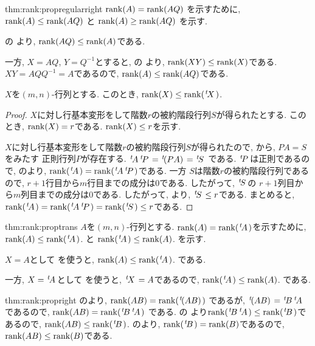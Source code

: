 \begin{proofof*}{thm:rank:prop}{regularright}
   $\operatorname{rank}(A)=\operatorname{rank}(AQ)$
  を示すために,
   $\operatorname{rank}(A)\leq\operatorname{rank}(AQ)$
  と
   $\operatorname{rank}(A)\geq\operatorname{rank}(AQ)$
  を示す.
  
  の
  より, $\operatorname{rank}(AQ)\leq \operatorname{rank}(A)$である.
  
  一方, 
  $X=AQ$, $Y=Q^{-1}$とすると,
  の
  より, $\operatorname{rank}(XY)\leq \operatorname{rank}(X)$である.
  $XY=AQQ^{-1}=A$であるので,
  $\operatorname{rank}(A)\leq\operatorname{rank}(AQ)$である.
\end{proofof*}

\begin{lemma}
  \label{lem:ineq:transrank}
  $X$を$(m,n)$-行列とする.
  このとき, $\operatorname{rank}(X)\leq \operatorname{rank}({\left.^{t}\!X\right.})$.
\end{lemma}
\begin{proof}
  $X$に対し行基本変形をして階数$r$の被約階段行列$S$が得られたとする.
  このとき, $\operatorname{rank}(X)=r$である.
  $\operatorname{rank}(X)\leq r$を示す.

  $X$に対し行基本変形をして階数$r$の被約階段行列$S$が得られたので,
  から,
  $PA=S$をみたす
  正則行列$P$が存在する.
  ${\left.^{t}\!A\right.}{\left.^{t}\!P\right.}={\left.^{t}\!(PA)\right.}={\left.^{t}\!S\right.}$
  である.
  ${\left.^{t}\!P\right.}$は正則であるので,
  のより,
  $\operatorname{rank}({\left.^{t}\!A\right.})=\operatorname{rank}({\left.^{t}\!A\right.}{\left.^{t}\!P\right.})$である.
  一方
  $S$は階数$r$の被約階段行列であるので,
  $r+1$行目から$m$行目までの成分は$0$である.
  したがって,
  ${\left.^{t}\!S\right.}$の
  $r+1$列目から$m$列目までの成分は$0$である.
  したがって,
  より,
  ${\left.^{t}\!S\right.}\leq r$である.
  まとめると,
  $\operatorname{rank}({\left.^{t}\!A\right.})=\operatorname{rank}({\left.^{t}\!A\right.}{\left.^{t}\!P\right.})=\operatorname{rank}({\left.^{t}\!S\right.})\leq r$である.
\end{proof}
\begin{proofof*}{thm:rank:prop}{trans}
  $A$を$(m,n)$-行列とする.
  $\operatorname{rank}(A)=\operatorname{rank}({\left.^{t}\!A\right.})$を示すために,
  $\operatorname{rank}(A)\leq\operatorname{rank}({\left.^{t}\!A\right.})$.
  と
  $\operatorname{rank}({\left.^{t}\!A\right.})\leq \operatorname{rank}(A)$.
  を示す.
  
  $X=A$として
  を使うと,
  $\operatorname{rank}(A)\leq\operatorname{rank}({\left.^{t}\!A\right.})$.
  である.

  一方,
  $X={\left.^{t}\!A\right.}$として
  を使うと,
  ${\left.^{t}\!X\right.}=A$であるので,
  $\operatorname{rank}({\left.^{t}\!A\right.})\leq \operatorname{rank}(A)$.
  である.
  
\end{proofof*}
\begin{proofof*}{thm:rank:prop}{right}
  のより,
  $\operatorname{rank}(AB)=\operatorname{rank}({\left.^{t}\!(AB)\right.})$
  であるが, ${\left.^{t}\!(AB)\right.}={\left.^{t}\!B\right.}{\left.^{t}\!A\right.}$であるので,
  $\operatorname{rank}(AB)=\operatorname{rank}({\left.^{t}\!B\right.}{\left.^{t}\!A\right.})$
  である.
  の
  より$\operatorname{rank}({\left.^{t}\!B\right.}{\left.^{t}\!A\right.})\leq\operatorname{rank}({\left.^{t}\!B\right.})$であるので,
  $\operatorname{rank}(AB)\leq\operatorname{rank}({\left.^{t}\!B\right.})$.
  のより,
  $\operatorname{rank}({\left.^{t}\!B\right.})=\operatorname{rank}(B)$であるので,
  $\operatorname{rank}(AB)\leq \operatorname{rank}(B)$である.
\end{proofof*}


